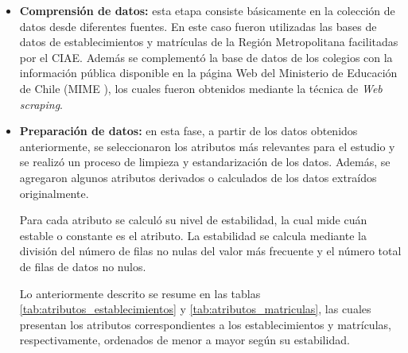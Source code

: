 \begin{itemize}
    \item \textbf{Comprensión de datos:} esta etapa consiste básicamente en la colección de datos desde diferentes fuentes. En este caso fueron utilizadas las bases de datos de establecimientos y matrículas de la Región Metropolitana facilitadas por el CIAE. Además se complementó la base de datos de los colegios con la información pública disponible en la página Web del Ministerio de Educación de Chile (MIME \cite{MIME}), los cuales fueron obtenidos mediante la técnica de \textit{Web scraping}.
    
    \item \textbf{Preparación de datos:} en esta fase, a partir de los datos obtenidos anteriormente, se seleccionaron los atributos más relevantes para el estudio y se realizó un proceso de limpieza y estandarización de los datos. Además, se agregaron algunos atributos derivados o calculados de los datos extraídos originalmente. 
    
    Para cada atributo se calculó su nivel de estabilidad, la cual mide cuán estable o constante es el atributo. La estabilidad se calcula mediante la división del número de filas no nulas del valor más frecuente y el número total de filas de datos no nulos. 
    
    Lo anteriormente descrito se resume en las tablas \ref{tab:atributos_establecimientos} y \ref{tab:atributos_matriculas}, las cuales presentan los atributos correspondientes a los establecimientos y matrículas, respectivamente, ordenados de menor a mayor según su estabilidad.


\end{itemize}
